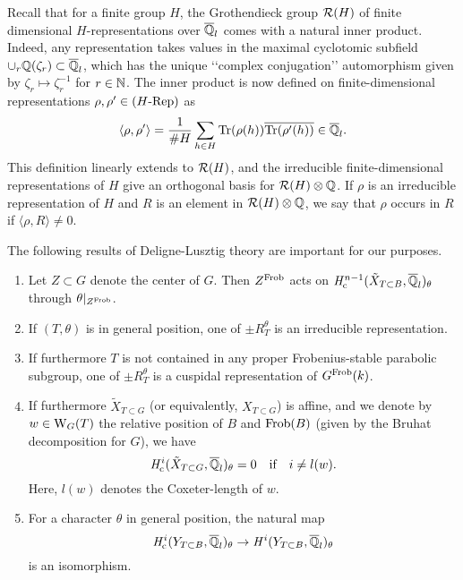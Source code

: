 \documentclass[../main.tex]{subfiles}
\begin{document}
Recall that for a finite group $H$, the Grothendieck group $\mathcal{R}(H)$ of finite 
dimensional $H$-representations over $\overline {\mathbb{Q}}_l$ comes with a natural inner
product. Indeed, any representation takes values in the maximal cyclotomic
subfield $\cup_{r} \mathbb{Q}(\zeta_r) \subset \overline {\mathbb{Q}}_l$, which has the unique 
‘‘complex conjugation’’ automorphism given by $\zeta_r \mapsto \zeta_r^{-1}$ for 
$r \in \mathbb{N}$. 
The inner product is now defined on finite-dimensional representations $\rho,
\rho' \in {({H}\textnormal-\allowbreak\mathrm{Rep})}$ as
\begin{equation*}
  \langle \rho, \rho' \rangle = \frac 1 {\# H} \sum_{h \in H} \operatorname{Tr}(\rho(h)) \overline {\operatorname{Tr} (\rho'(h))} \in \overline {\mathbb{Q}}_l.
\end{equation*}
This definition linearly extends to $\mathcal{R}(H)$, and the irreducible
finite-dimensional representations of $H$ give an orthogonal basis for $\mathcal{R}(H)
\otimes \mathbb{Q}$. If $\rho$ is an irreducible representation of $H$ and 
$R$ is an element in $\mathcal{R}(H) \otimes \mathbb{Q}$, we say that $\rho$ occurs in $R$ if 
$\langle \rho, R\rangle \neq 0$.

The following results of Deligne-Lusztig theory are important for our purposes.

\begin{thm}\label{thm:DLTheoryGeneralResults}
  \leavevmode
  \begin{enumerate}
      \item \textnormal{\cite[Corollary 1.22]{delignelusztig1976}} Let $Z \subset G$
        denote the center of $G$. Then $Z^{\mathrm{Frob}}$ acts on $\mathit H_{\mathrm{c}}^{n-1}(\tilde
        X_{T \subset B}, \overline {\mathbb{Q}}_l)_{\theta}$ through $\theta|_{Z^{\mathrm{Frob}}}$.
      \item \textnormal{\cite[Corollary 7.3]{delignelusztig1976}} If 
        $(T, \theta)$ is in general position, one of $\pm R_T^\theta$ is an 
        irreducible representation.
      \item \textnormal{\cite[Corollary 8.3]{delignelusztig1976}} If furthermore
        $T$ is not contained in any proper Frobenius-stable parabolic subgroup,
        one of $\pm R^\theta_T$ is a cuspidal representation of $G^{\mathrm{Frob}}(k)$.
      \item \textnormal{\cite[Corollary 9.9]{delignelusztig1976}} If furthermore
        $\tilde X_{T \subset G}$ (or equivalently, $X_{T \subset G}$) is affine, 
        and we denote by $w \in \mathrm W_G(T)$ the relative position of $B$ and
        $\mathrm{Frob}(B)$ (given by the Bruhat decomposition for $G$),
        we have $$\mathit H_{\mathrm{c}}^i(\tilde X_{T \subset G}, \overline {\mathbb{Q}}_l)_\theta = 0 \quad \text{if}
        \quad i \neq l(w).$$
        Here, $l(w)$ denotes the Coxeter-length of $w$.
      \item \textnormal{\cite[Theorem 9.8]{delignelusztig1976}} For a character 
        $\theta$ in general position, the natural map
        \begin{equation*}
          \mathit H_{\mathrm{c}}^i(Y_{T \subset B},\overline {\mathbb{Q}}_l)_\theta \to \mathit H^i(Y_{T \subset
          B}, \overline {\mathbb{Q}}_l)_\theta
        \end{equation*}
        is an isomorphism.
    \end{enumerate}
\end{thm}
\end{document}
